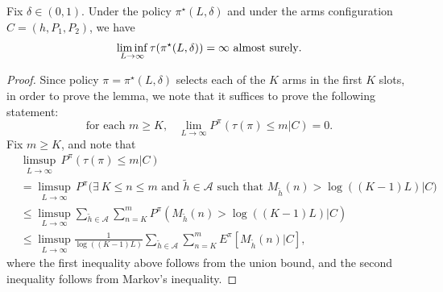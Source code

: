\begin{lemma}\label{rested_arms_lemma:stopping_time_of_policy_goes_to_infinity}
	Fix $\delta\in(0,1)$. Under the policy $\pi^{\star}(L,\delta)$ and under the arms configuration $C=(h,P_1,P_2)$, we have
	\begin{equation}
		\liminf\limits_{L\to\infty}\tau(\pi^{\star}(L,\delta))=\infty\text{ \text{almost surely}}.\label{rested_arms_eq:stopping_time_of_policy_goes_to_infinity}
	\end{equation}
\end{lemma}
\begin{proof}
	Since policy $\pi=\pi^{\star}(L,\delta)$ selects each of the $K$ arms in the first $K$ slots, in order to prove the lemma, we note that it suffices to prove the following statement:
\begin{equation}
	\text{for each $m\geq K$,}\quad \lim\limits_{L\to\infty}P^\pi(\tau(\pi)\leq m|C)=0.
\end{equation}
Fix $m\geq K$, and note that
\begingroup\allowdisplaybreaks\begin{align}
	&\limsup\limits_{L\to\infty}\,P^\pi(\tau(\pi)\leq m|C)\nonumber\\
	&=\limsup\limits_{L\to\infty}\,P^\pi\bigg(\exists~K\leq n\leq m \text{ and }\tilde{h}\in\mathcal{A}
	\text{ such that }M_{\tilde{h}}(n)>\log((K-1)L)\bigg|C\bigg)\nonumber\\
	&\leq \limsup\limits_{L\to\infty}\sum\limits_{\tilde{h}\in\mathcal{A}}\sum\limits_{n=K}^{m}P^\pi(M_{\tilde{h}}(n)>\log((K-1)L)|C)\nonumber\\
	&\leq \limsup\limits_{L\to\infty}\frac{1}{\log((K-1)L)}\sum\limits_{\tilde{h}\in\mathcal{A}}\sum\limits_{n=K}^{m}E^\pi[M_{\tilde{h}}(n)|C],\label{rested_arms_eq:stop_time_goes_to_infty_1}
\end{align}\endgroup
where the first inequality above follows from the union bound, and the second inequality follows from Markov's inequality.


\end{proof}
